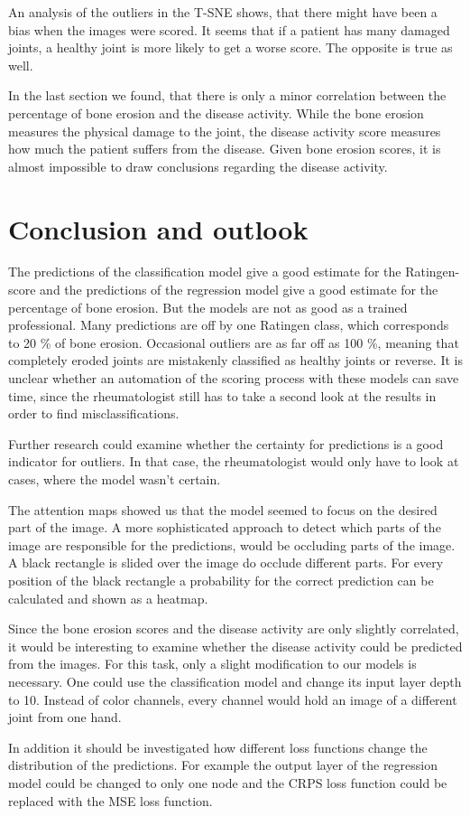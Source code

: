 \documentclass[12pt]{article}
\begin{document}
An analysis of the outliers in the T-SNE shows, that there might have been a bias when the images were scored. It seems that if a patient has many damaged joints, a healthy joint is more likely to get a worse score. The opposite is true as well.

In the last section we found, that there is only a minor correlation between the percentage of bone erosion and the disease activity. While the bone erosion measures the physical damage to the joint, the disease activity score measures how much the patient suffers from the disease. Given bone erosion scores, it is almost impossible to draw conclusions regarding the disease activity.



\newpage
\section{Conclusion and outlook}
\label{sec:conclusion}

The predictions of the classification model give a good estimate for the Ratingen-score and the predictions of the regression model give a good estimate for the percentage of bone erosion. But the models are not as good as a trained professional. Many predictions are off by one Ratingen class, which corresponds to 20 \% of bone erosion. Occasional outliers are as far off as 100 \%, meaning that completely eroded joints are mistakenly classified as healthy joints or reverse. It is unclear whether an automation of the scoring process with these models can save time, since the rheumatologist still has to take a second look at the results in order to find misclassifications.

Further research could examine whether the certainty for predictions is a good indicator for outliers. In that case, the rheumatologist would only have to look at cases, where the model wasn't certain.

The attention maps showed us that the model seemed to focus on the desired part of the image. A more sophisticated approach to detect which parts of the image are responsible for the predictions, would be occluding parts of the image. A black rectangle is slided over the image do occlude different parts. For every position of the black rectangle a probability for the correct prediction can be calculated and shown as a heatmap.

Since the bone erosion scores and the disease activity are only slightly correlated, it would be interesting to examine whether the disease activity could be predicted from the images. For this task, only a slight modification to our models is necessary. One could use the classification model and change its input layer depth to 10. Instead of color channels, every channel would hold an image of a different joint from one hand.

In addition it should be investigated how different loss functions change the distribution of the predictions. For example the output layer of the regression model could be changed to only one node and the CRPS loss function could be replaced with the MSE loss function.
 

\newpage
\printbibliography

\newpage
\listoffigures

\newpage
\listoftables
\end{document}
